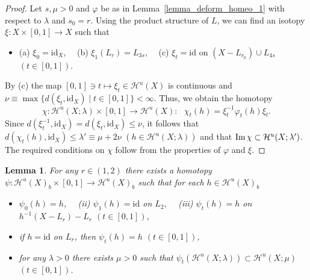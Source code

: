\documentclass[11pt, fleqn]{amsart}
\newtheorem{lemma}{Lemma}[section]
\theoremstyle{definition}
\newcommand{\lmt}{\longmapsto}
\newcommand{\cal}{\mathcal}
\renewcommand{\phi}{\varphi}
\newcommand{\lra}{\longrightarrow}
\newcommand{\id}{\mathrm{id}}
\begin{document}
\begin{proof} Let $s, \mu > 0$ and $\phi$ be as in Lemma~\ref{lemma_deform_homeo_1} with respect to $\lambda$ and $s_0 = r$. 
Using the product structure of $L$, we can find an isotopy  
$\xi : X \times [0,1] \to X$ such that 
\begin{itemize}
\item[] (a) $\xi_0 = \id_X$, \ \ (b) $\xi_1(L_r) = L_{3s}$, \ \ (c) $\xi_t = \id$ on $(X - L_{r_0}) \cup L_{4s}$ \ $(t \in [0,1])$. 
\end{itemize}
By (c) the map $[0,1] \ni t \lmt \xi_t \in {\cal H}^u(X)$ is continuous and $\nu \equiv \max \{ d(\xi_t, \id_X) \mid t \in [0,1] \} < \infty$. 
Thus, we obtain the homotopy 
$$\chi : {\cal H}^u(X; \lambda) \times [0,1] \lra {\cal H}^u(X) : \ \ \ \chi_t(h) = \xi_t^{-1} \phi_t(h) \xi_t.$$ 
Since $d(\xi_t^{-1}, \id_X) = d(\xi_t, \id_X) \leq \nu$, it follows that 
$d(\chi_t(h), \id_X) \leq \lambda' \equiv \mu + 2 \nu$ $(h \in {\cal H}^u(X; \lambda))$ and that ${\rm Im}\, \chi \subset {\cal H}^u(X; \lambda')$. 
The required conditions on $\chi$ follow from the properties of $\phi$ and $\xi$. 
\end{proof}

\begin{lemma}\label{lemma_deform_homeo_3} For any $r \in (1,2)$ there exists a homotopy $\psi : {\cal H}^u(X)_b \times [0,1] \lra {\cal H}^u(X)_b$
such that for each $h \in {\cal H}^u(X)_b$
\begin{itemize}
\item[(i)\,] $\psi_0(h) = h$, \ \ {\rm (ii)} $\psi_1(h) = \id$ on $L_2$, \ \ {\rm (iii)} $\psi_t(h) = h$ on $h^{-1}(X - L_r) - L_r$ $(t \in [0,1])$, 
\item[(iv)] if $h = \id$ on $L_r$, then $\psi_t(h) = h$ $(t \in [0,1])$, 
\item[(v)\,] for any $\lambda > 0$ there exists $\mu > 0$ such that $\psi_t({\cal H}^u(X; \lambda)) \subset {\cal H}^u(X; \mu)$ $(t \in [0,1])$. 
\end{itemize} 
\end{lemma}
\end{document}
